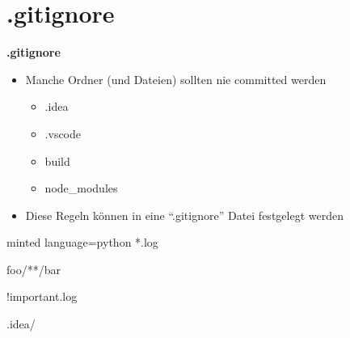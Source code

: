\section{.gitignore}\label{sec:.gitignore}

\begin{frame}[b]
    \begin{center}
        
    \end{center}
    \vfill
    \begin{flushleft}
        \Huge
        \textbf{.gitignore}
    \end{flushleft}
\end{frame}

\begin{frame}
    \slidehead
    \begin{itemize}[<+->]
        \item Manche Ordner (und Dateien) sollten nie committed werden
            \begin{itemize}
                \item .idea
                \item .vscode
                \item build
                \item node\_modules
            \end{itemize}
        \item Diese Regeln können in eine \enquote{.gitignore} Datei festgelegt werden
    \end{itemize}
\end{frame}

\begin{frame}[fragile]
    \slidehead
    \begin{codeBlock}[]{minted language=python}
        *.log

        foo/**/bar

        !important.log

        .idea/
    \end{codeBlock}
    \renewcommand{\thefootnote}{\relax}
\end{frame}
